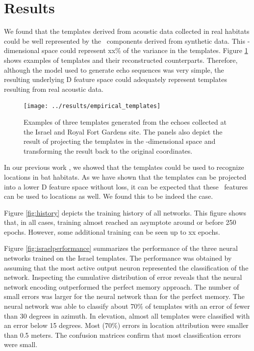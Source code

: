 \documentclass[preprint,5p]{elsarticle}
\begin{document}
\section{Results}

We found that the templates derived from acoustic data collected in real habitats could be well represented by the \pca\ components derived from synthetic data. This \pca-dimensional space could represent xx\% of the variance in the templates. Figure \ref{fig:empiricaltemplates} shows examples of templates and their reconstructed counterparts. Therefore, although the model used to generate echo sequences was very simple, the resulting underlying \pca D feature space could adequately represent templates resulting from real acoustic data.

\begin{figure}[tb]
	\centering
	\texttt{[image: ../results/empirical\_templates]}
	\caption{Examples of three templates generated from the echoes collected at the Israel and Royal Fort Gardens site. The panels also depict the result of projecting the templates in the 
		\pca-dimensional space and transforming the result back to the original coordinates.}
	\label{fig:empiricaltemplates}
\end{figure}

In our previous work \cite{Vanderelst2016}, we showed that the templates could be used to recognize locations in bat habitats. As we have shown that the templates can be projected into a lower \pca D feature space without loss, it can be expected that these \pca\ features can be used to locations as well. We found this to be indeed the case.

Figure \ref{fig:history} depicts the training history of all networks. This figure shows that, in all cases, training almost reached an asymptote around or before 250 epochs. However, some additional training can be seen up to xx epochs.



Figure \ref{fig:israelperformance} summarizes the performance of the three neural networks trained on the Israel templates. The performance was obtained by assuming that the most active output neuron represented the classification of the network. Inspecting the cumulative distribution of error reveals that the neural network encoding outperformed the perfect memory approach. The number of small errors was larger for the neural network than for the perfect memory. The neural network was able to classify about 70\% of templates with an error of fewer than 30 degrees in azimuth. In elevation, almost all templates were classified with an error below 15 degrees. Most (70\%) errors in location attribution were smaller than 0.5 meters. The confusion matrices confirm that most classification errors were small.
\end{document}
